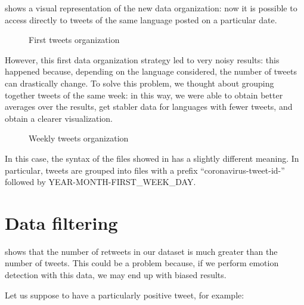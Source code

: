  shows a visual representation of the new data organization: now it is possible to access directly to tweets of the same language posted on a particular date.

\begin{figure}[H]
	\caption{First tweets organization}
	\label{fig:tweet-org-1}
\end{figure}

However, this first data organization strategy led to very noisy results: this happened because, depending on the language considered, the number of tweets can drastically change. To solve this problem, we thought about grouping together tweets of the same week: in this way, we were able to obtain better averages over the results, get stabler data for languages with fewer tweets, and obtain a clearer visualization.

\begin{figure}[H]
	\caption{Weekly tweets organization}
	\label{fig:tweet-org-2}
\end{figure}

In this case, the syntax of the files showed in  has a slightly different meaning. In particular, tweets are grouped into files with a prefix “coronavirus-tweet-id-” followed by YEAR-MONTH-FIRST\_WEEK\_DAY.

\section{Data filtering}
\label{sec:data-filtering}

 shows that the number of retweets in our dataset is much greater than the number of tweets. This could be a problem because, if we perform emotion detection with this data, we may end up with biased results. 

Let us suppose to have a particularly positive tweet, for example:

